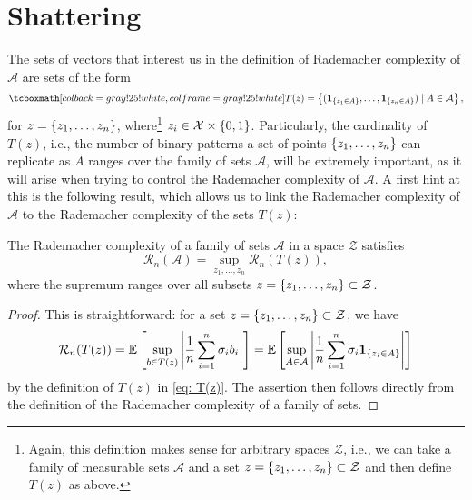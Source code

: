 \section{Shattering}

The sets of vectors that interest us in the definition of Rademacher complexity of
$\mathcal{A}$ are sets of the form
\begin{equation}
\label{eq: T(z)}
    \highlightMath{
        T(z) = \set{(\indSet{z_1 \in A}, \dots, \indSet{z_n \in A}) \with A \in \mathcal{A}},
    }
\end{equation}
for $z = \left\{z_1, \dots, z_n\right\}$, where\footnote{Again, this definition makes sense for arbitrary spaces $\mathcal{Z}$, i.e., we can take a family of measurable sets $\mathcal{A}$ and a set $z = \left\{z_1, \dots, z_n\right\} \subset \mathcal{Z}$ and then define $T(z)$ as above.} $z_i \in \mathcal{X} \times \left\{0, 1\right\}$. Particularly, the cardinality of $T(z)$, i.e., the number of binary patterns a set of points $\left\{z_1, \dots, z_n\right\}$ can replicate as $A$ ranges over the family of sets $\mathcal{A}$, will be extremely important, as it will arise when trying to control the Rademacher complexity of $\mathcal{A}$. A first hint at this is the following result, which allows us to link the Rademacher complexity of $\mathcal{A}$ to the Rademacher complexity of the sets $T(z)$:

\begin{lemma}
\label{lem: rademacher complexity}
The Rademacher complexity of a family of sets $\mathcal{A}$ in a space $\mathcal{Z}$ satisfies
\[
    \mathcal{R}_n(\mathcal{A}) = \sup_{z_1, \dots, z_n} \mathcal{R}_n(T(z)),
\]
where the supremum ranges over all subsets $z = \left\{z_1, \dots, z_n\right\} \subset \mathcal{Z}$.
\end{lemma}

\begin{proof}
This is straightforward: for a set $z = \left\{z_1, \dots, z_n\right\} \subset \mathcal{Z}$, we have
\[
    \mathcal{R}_n(T(z)) = \mathbb{E}\left[ \sup_{b \in T(z)} \abs{\frac{1}{n} \sum_{i=1}^n \sigma_i b_i}\right] = \mathbb{E}\left[ \sup_{A \in \mathcal{A}} \abs{\frac{1}{n} \sum_{i=1}^n \sigma_i \mathbf{1}_{\left\{z_i \in A\right\}}}\right]
\]
by the definition of $T(z)$ in \eqref{eq: T(z)}. The assertion then follows directly from the definition of the Rademacher complexity of a family of sets.
\end{proof}

